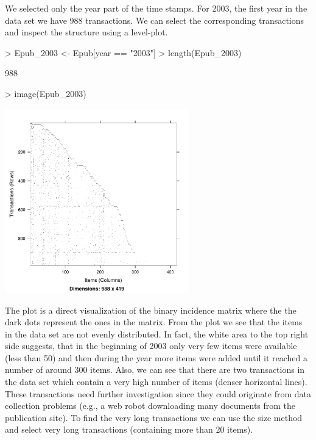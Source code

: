 \documentclass[10pt,a4paper]{article}
\begin{document}
We selected only the year part of the time stamps. For 2003, the first year
in the data set we have 988 transactions.
We can select the corresponding transactions and inspect the structure
using a level-plot. 

\begin{Schunk}
\begin{Sinput}
> Epub_2003 <- Epub[year == "2003"]
> length(Epub_2003)
\end{Sinput}
\begin{Soutput}
[1] 988
\end{Soutput}
\begin{Sinput}
> image(Epub_2003)
\end{Sinput}
\end{Schunk}
\begin{center}
\includegraphics[width=8cm]{arules-epub_image}
\end{center}

The plot is a direct visualization of the binary incidence matrix where
the the dark dots represent the ones in the matrix.  From the plot we
see that the items in the data set are not evenly distributed.  In fact,
the white area to the top right side suggests, that in the beginning of
2003 only very few items were available (less than 50) and then during
the year more items were added until it reached a number of around 300
items. Also, we can see that there are two transactions in the data set
which contain a very high number of items (denser horizontal lines).
These transactions need further investigation since they could originate
from data collection problems (e.g., a web robot downloading many
documents from the publication site).  To find the very long
transactions we can use the size method and select very long
transactions (containing more than 20 items).
\end{document}
